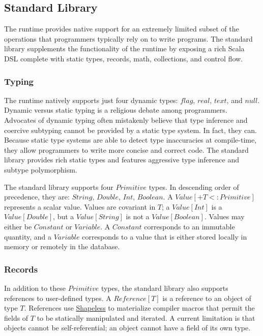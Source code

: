 \documentclass[../main.tex]{subfiles}
\begin{document}
  \subsection{Standard Library}
  The runtime provides native support for an extremely limited subset of the operations that
  programmers typically rely on to write programs. The standard library supplements the
  functionality of the runtime by exposing a rich Scala DSL complete with static types, records,
  math, collections, and control flow.

    \subsubsection{Typing}
    The runtime natively supports just four dynamic types: $flag$, $real$, $text$, and $null$.
    Dynamic versus static typing is a religious debate among programmers. Advocates of dynamic
    typing often mistakenly believe that type inference and coercive subtyping cannot be provided by
    a static type system. In fact, they can. Because static type systems are able to
    detect type inaccuracies at compile-time, they allow programmers to write more concise and
    correct code. \cite{typing} The standard library provides rich static types and features
    aggressive type inference and subtype polymorphism.

    The standard library supports four $Primitive$ types. In descending order of precedence, they
    are: $String$, $Double$, $Int$, $Boolean$. A $Value[+T <: Primitive]$ represents a scalar value.
    Values are covariant in $T$; a $Value[Int]$ is a $Value[Double]$, but a $Value[String]$ is
    not a $Value[Boolean]$. Values may either be $Constant$ or $Variable$. A $Constant$ corresponds
    to an immutable quantity, and a $Variable$ corresponds to a value that is either stored locally
    in memory or remotely in the database.

    \subsubsection{Records}
    In addition to these $Primitive$ types, the standard library also supports references to
    user-defined types. A $Reference[T]$ is a reference to an object of type $T$. References use
    \href{https://github.com/milessabin/shapeless}{Shapeless} to materialize compiler macros that
    permit the fields of $T$ to be statically manipulated and iterated. A current limitation is that
    objects cannot be self-referential; an object cannot have a field of its own type.
\end{document}
